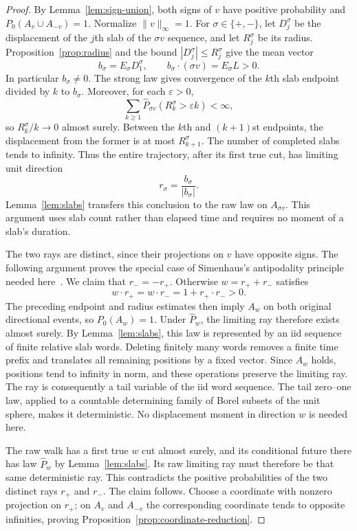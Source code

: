 \begin{proof}
By Lemma~\ref{lem:sign-union}, both signs of $v$ have positive
probability and $P_0(A_v\cup A_{-v})=1$.
Normalize $\|v\|_\infty=1$.
For $\sigma\in\{+,-\}$, let $D_j^\sigma$ be the displacement of
the $j$th slab of the $\sigma v$ sequence, and let $R_j^\sigma$ be
its radius.  Proposition~\ref{prop:radius} and the bound
$|D_j^\sigma|\le R_j^\sigma$ give the mean vector
\[
 b_\sigma=E_\sigma D_1^\sigma,
 \qquad b_\sigma\cdot(\sigma v)=E_\sigma L>0.
\]
In particular $b_\sigma\ne0$.
The strong law gives convergence of the $k$th slab endpoint divided
by $k$ to $b_\sigma$.  Moreover, for each $\varepsilon>0$,
\[
 \sum_{k\ge1}\widehat P_{\sigma v}(R_k^\sigma>\varepsilon k)<\infty,
\]
so $R_k^\sigma/k\to0$ almost surely.  Between the $k$th and
$(k+1)$st endpoints, the displacement from the former is at most
$R_{k+1}^\sigma$.  The number of completed slabs tends to infinity.
Thus the entire trajectory, after its first true cut, has limiting
unit direction
\[
 r_\sigma=\frac{b_\sigma}{|b_\sigma|}.
\]
Lemma~\ref{lem:slabs} transfers this conclusion to the raw law on
$A_{\sigma v}$.  This argument uses slab count rather than elapsed
time and requires no moment of a slab's duration.

The two rays are distinct, since their projections on $v$ have
opposite signs.  The following argument proves the special case of
Simenhaus's antipodality principle needed here~\cite[Proposition~1]{Simenhaus2007}.
We claim that $r_-=-r_+$.  Otherwise
$w=r_++r_-$ satisfies
\[
 w\cdot r_+=w\cdot r_-=1+r_+\cdot r_->0.
\]
The preceding endpoint and radius estimates then imply $A_w$ on
both original directional events, so $P_0(A_w)=1$.
Under $\widehat P_w$, the limiting ray therefore exists almost
surely.  By Lemma~\ref{lem:slabs}, this law is represented by an
iid sequence of finite relative slab words.  Deleting finitely
many words removes a finite time prefix and translates all remaining
positions by a fixed vector.  Since $A_w$ holds, positions tend to
infinity in norm, and these operations preserve the limiting ray.
The ray is consequently a tail variable of the iid word sequence.
The tail zero--one law, applied to a countable determining family
of Borel subsets of the unit sphere, makes it deterministic.
No displacement moment in direction $w$ is needed here.

The raw walk has a first true $w$ cut almost surely, and its
conditional future there has law $\widehat P_w$ by
Lemma~\ref{lem:slabs}.  Its raw limiting ray must therefore be that
same deterministic ray.  This contradicts the positive
probabilities of the two distinct rays $r_+$ and $r_-$.
The claim follows.  Choose a coordinate with nonzero projection
on $r_+$; on $A_v$ and $A_{-v}$ the corresponding coordinate
tends to opposite infinities, proving
Proposition~\ref{prop:coordinate-reduction}.
\end{proof}

